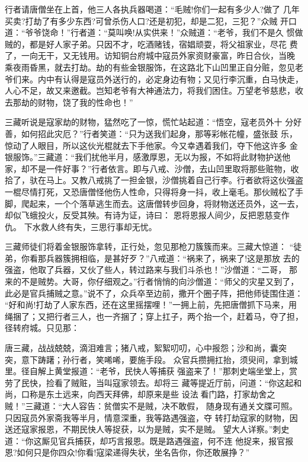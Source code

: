 行者请唐僧坐在上首，他三人各执兵器喝道：“毛贼!你们一起有多少人?做了
几年买卖?打劫了有多少东西?可曾杀伤人口?还是初犯，却是二犯，三犯？”众贼
开口道：“爷爷饶命！”行者道：“莫叫唤!从实供来！”众贼道：“老爷，我们不是久
惯做贼的，都是好人家子弟。只因不才，吃酒赌钱，宿娼顽耍，将父祖家业，尽花
费了，一向无干，又无钱用。访知铜台府城中寇员外家资财豪富，昨日合伙，当晚
乘夜雨昏黑，就去打劫。劫的有些金银服饰，在这路北下山凹里正自分赃，忽见老
爷们来。内中有认得是寇员外送行的，必定身边有物；又见行李沉重，白马快走，
人心不足，故又来邀截。岂知老爷有大神通法力，将我们困住。万望老爷慈悲，收
去那劫的财物，饶了我的性命也！”

三藏听说是寇家劫的财物，猛然吃了一惊，慌忙站起道：“悟空，寇老员外十
分好善，如何招此灾厄？”行者笑道：“只为送我们起身，那等彩帐花幢，盛张鼓
乐，惊动了人眼目，所以这伙光棍就去下手他家。今又幸遇着我们，夺下他这许多
金银服饰。”三藏道：“我们扰他半月，感激厚恩，无以为报，不如将此财物护送他
家，却不是一件好事？”行者依言。即与八戒、沙僧，去山凹里取将那些赃物，收
拾了，驮在马上。又教八戒挑了一担金银，沙僧挑着自己行李。行者欲将这伙强盗
一棍尽情打死，又恐唐僧怪他伤人性命，只得将身一抖，收上毫毛。那伙贼松了手
脚，爬起来，一个个落草逃生而去。这唐僧转步回身，将财物送还员外，这一去，
却似飞蛾投火，反受其殃。有诗为证，诗曰：
恩将恩报人间少，反把恩慈变作仇。
下水救人终有失，三思行事却无忧。

三藏师徒们将着金银服饰拿转，正行处，忽见那枪刀簇簇而来。三藏大惊道：
“徒弟，你看那兵器簇拥相临，是甚好歹？”八戒道：“祸来了，祸来了!这是那放
去的强盗，他取了兵器，又伙了些人，转过路来与我们斗杀也！”沙僧道：“二哥，
那来的不是贼势。大哥，你仔细观之。”行者悄悄的向沙僧道：“师父的灾星又到了，
此必是官兵捕贼之意。”说不了，众兵卒至边前，撒开个圈子阵，把他师徒围住道：
“好和尚!打劫了人家东西，还在这里摇摆哩！”一拥上前，先把唐僧抓下马来，用
绳捆了；又把行者三人，也一齐捆了；穿上扛子，两个抬一个，赶着马，夺了担，
径转府城。只见那：

唐三藏，战战兢兢，滴泪难言；猪八戒，絮絮叨叨，心中报怨；沙和尚，囊突
突，意下踌躇；孙行者，笑唏唏，要施手段。
众官兵攒拥扛抬，须臾间，拿到城里。径自解上黄堂报道：“老爷，民快人等捕获
强盗来了！”那刺史端坐堂上，赏劳了民快，捡看了贼赃，当叫寇家领去。却将三
藏等提近厅前，问道：“你这起和尚，口称是东土远来，向西天拜佛，却原来是些
设法看门路，打家劫舍之贼！”三藏道：“大人容告：贫僧实不是贼，决不敢假，
随身现有通关文牒可照。只因寇员外家斋我等半月，情意深重，我等路遇强盗，夺
转打劫寇家的财物，因送还寇家报恩，不期民快人等捉获，以为是贼，实不是贼。
望大人详察。”刺史道：“你这厮见官兵捕获，却巧言报恩。既是路遇强盗，何不连
他捉来，报官报恩?如何只是你四众!你看!寇梁递得失状，坐名告你，你还敢展挣？”

